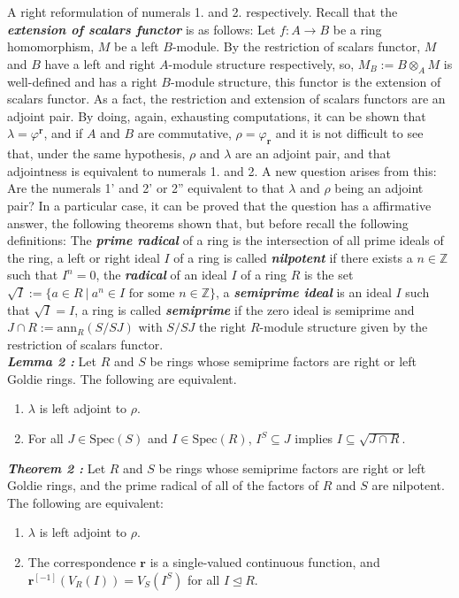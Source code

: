 \documentclass[final]{beamer}
\newlength{\colwidth}
\newcommand{\ideal}{\trianglelefteq}
\newcommand{\spec}{\mathrm{Spec}}
\newcommand{\Z}{\mathbb{Z}}
\newcommand{\defi}[1]{\textbf{\textsl{#1}}}
\newcommand{\ann}{\mathrm{ann}}
\begin{document}
\begin{frame}[t, fragile]
\begin{columns}[t]
\begin{column}{\colwidth}
\begin{block}{A right reformulation of numerals 1. and 2.}
    respectively. Recall that the \defi{extension of scalars functor} is as follows: Let $f:A\to B$ be a ring homomorphism, $M$ be a left $B$-module. By the restriction of scalars functor, $M$ and $B$ have a left and right $A$-module structure respectively, so, $M_B:=B\otimes_A M$ is well-defined and has a right $B$-module structure, this functor is the extension of scalars functor. As a fact, the restriction and extension of scalars functors are an adjoint pair. By doing, again, exhausting computations, it can be shown that $\lambda =\varphi^\mathbf{r}$, and if $A$ and $B$ are commutative, $\rho=\varphi_\mathbf{r}$ and it is not difficult to see that, under the same hypothesis, $\rho$ and $\lambda$ are an adjoint pair, and that adjointness is equivalent to numerals 1. and 2. A new question arises from this: Are the numerals 1' and 2' or 2'' equivalent to that $\lambda$ and $\rho$ being an adjoint pair? In a particular case, it can be proved that the question has a affirmative answer, the following theorems shown that, but before recall the following definitions: The \defi{prime radical} of a ring is the intersection of all prime ideals of the ring, a left or right ideal $I$ of a ring is called \defi{nilpotent} if there exists a $n\in\Z$ such that $I^n=0$, the \defi{radical} of an ideal $I$ of a ring $R$ is the set $\sqrt{I}:=\{a\in R~|~\text{$a^n\in I$ for some $n\in\Z$}\}$, a \defi{semiprime ideal} is an ideal $I$ such that $\sqrt{I}=I$, a ring is called \defi{semiprime} if the zero ideal is semiprime and $J\cap R:=\ann_R(S/SJ)$ with $S/SJ$ the right $R$-module structure given by the restriction of scalars functor.\\
    \vspace{0.5cm} \defi{Lemma 2 \cite{Letzter}:} Let $R$ and $S$ be rings whose semiprime factors are right or left Goldie rings. The following are equivalent.
    \begin{enumerate}
        \item $\lambda$ is left adjoint to $\rho$.
        \item For all $J\in\spec(S)$ and $I\in\spec(R)$, $I^S\subseteq J$ implies $I\subseteq \sqrt{J\cap R}$.
    \end{enumerate}
    \vspace{0.5cm}\defi{Theorem 2 \cite{Letzter}:} Let $R$ and $S$ be rings whose semiprime factors are right or left Goldie rings, and the prime radical of all of the factors of $R$ and $S$ are nilpotent. The following are equivalent:
    \begin{enumerate}
        \item $\lambda$ is left adjoint to $\rho$.
        \item The correspondence $\mathbf{r}$ is a single-valued continuous function, and $\mathbf{r}^{[-1]}(V_R(I))=V_S(I^S)$ for all $I\ideal R$.
    \end{enumerate}
    

\end{block}
\end{column}
\end{columns}
\end{frame}
\end{document}
